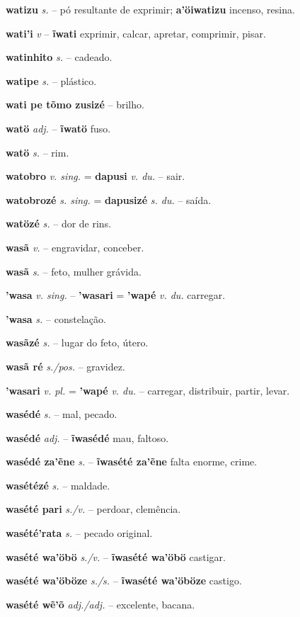 \textbf{watizu} \textit{s.} -- pó resultante de exprimir; \textbf{a'öiwatizu} incenso, resina.

\textbf{wati'i} \textit{v} -- \textbf{ĩwati} exprimir, calcar, apretar, comprimir, pisar.

\textbf{watinhito} \textit{s.} -- cadeado.

\textbf{watipe} \textit{s.} -- plástico.

\textbf{wati pe tõmo zusizé} \textit{} -- brilho.

\textbf{watö} \textit{adj.} -- \textbf{ĩwatö} fuso.

\textbf{watö} \textit{s.} -- rim.

\textbf{watobro} \textit{v. sing.} = \textbf{dapusi} \textit{v. du.} -- sair.

\textbf{watobrozé} \textit{s. sing.} = \textbf{dapusizé} \textit{s. du.} -- saída.

\textbf{watözé} \textit{s.} -- dor de rins.

\textbf{wasã} \textit{v.} -- engravidar, conceber.

\textbf{wasã} \textit{s.} -- feto, mulher grávida.

\textbf{'wasa} \textit{v. sing.} -- \textbf{'wasari} = \textbf{'wapé} \textit{v. du.} carregar.

\textbf{'wasa} \textit{s.} -- constelação.

\textbf{wasãzé} \textit{s.} -- lugar do feto, útero.

\textbf{wasã ré} \textit{s./pos.} -- gravidez.

\textbf{'wasari} \textit{v. pl.} = \textbf{'wapé} \textit{v. du.} -- carregar, distribuir, partir, levar.

\textbf{wasédé} \textit{s.} -- mal, pecado.

\textbf{wasédé} \textit{adj.} -- \textbf{ĩwasédé} mau, faltoso.

\textbf{wasédé za'ẽne} \textit{s.} -- \textbf{ĩwasété za'ẽne} falta enorme, crime.

\textbf{wasétézé} \textit{s.} -- maldade.

\textbf{wasété pari} \textit{s./v.} -- perdoar, clemência.

\textbf{wasété'rata} \textit{s.} -- pecado original.

\textbf{wasété wa'öbö} \textit{s./v.} -- \textbf{ĩwasété wa'öbö} castigar.

\textbf{wasété wa'öböze} \textit{s./s.} -- \textbf{ĩwasété wa'öböze} castigo.

\textbf{wasété wẽ'õ} \textit{adj./adj.} -- excelente, bacana.

